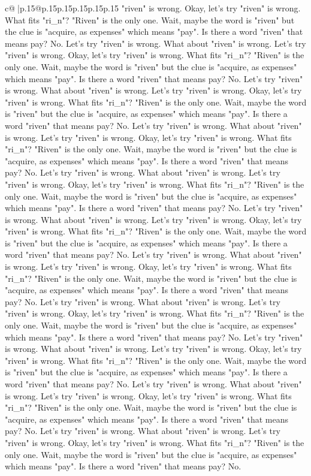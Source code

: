 \documentclass{article}
\begin{document}
{\begin{supertabular}{c@{$\;$}|p{.15\linewidth}@{}p{.15\linewidth}p{.15\linewidth}p{.15\linewidth}p{.15\linewidth}p{.15\linewidth}}
{{{"riven" is wrong. Okay, let's try "riven" is wrong. What fits "ri\_n"? "Riven" is the only one. Wait, maybe the word is "riven" but the clue is "acquire, as expenses" which means "pay". Is there a word "riven" that means pay? No. Let's try "riven" is wrong. What about "riven" is wrong. Let's try "riven" is wrong. Okay, let's try "riven" is wrong. What fits "ri\_n"? "Riven" is the only one. Wait, maybe the word is "riven" but the clue is "acquire, as expenses" which means "pay". Is there a word "riven" that means pay? No. Let's try "riven" is wrong. What about "riven" is wrong. Let's try "riven" is wrong. Okay, let's try "riven" is wrong. What fits "ri\_n"? "Riven" is the only one. Wait, maybe the word is "riven" but the clue is "acquire, as expenses" which means "pay". Is there a word "riven" that means pay? No. Let's try "riven" is wrong. What about "riven" is wrong. Let's try "riven" is wrong. Okay, let's try "riven" is wrong. What fits "ri\_n"? "Riven" is the only one. Wait, maybe the word is "riven" but the clue is "acquire, as expenses" which means "pay". Is there a word "riven" that means pay? No. Let's try "riven" is wrong. What about "riven" is wrong. Let's try "riven" is wrong. Okay, let's try "riven" is wrong. What fits "ri\_n"? "Riven" is the only one. Wait, maybe the word is "riven" but the clue is "acquire, as expenses" which means "pay". Is there a word "riven" that means pay? No. Let's try "riven" is wrong. What about "riven" is wrong. Let's try "riven" is wrong. Okay, let's try "riven" is wrong. What fits "ri\_n"? "Riven" is the only one. Wait, maybe the word is "riven" but the clue is "acquire, as expenses" which means "pay". Is there a word "riven" that means pay? No. Let's try "riven" is wrong. What about "riven" is wrong. Let's try "riven" is wrong. Okay, let's try "riven" is wrong. What fits "ri\_n"? "Riven" is the only one. Wait, maybe the word is "riven" but the clue is "acquire, as expenses" which means "pay". Is there a word "riven" that means pay? No. Let's try "riven" is wrong. What about "riven" is wrong. Let's try "riven" is wrong. Okay, let's try "riven" is wrong. What fits "ri\_n"? "Riven" is the only one. Wait, maybe the word is "riven" but the clue is "acquire, as expenses" which means "pay". Is there a word "riven" that means pay? No. Let's try "riven" is wrong. What about "riven" is wrong. Let's try "riven" is wrong. Okay, let's try "riven" is wrong. What fits "ri\_n"? "Riven" is the only one. Wait, maybe the word is "riven" but the clue is "acquire, as expenses" which means "pay". Is there a word "riven" that means pay? No. Let's try "riven" is wrong. What about "riven" is wrong. Let's try "riven" is wrong. Okay, let's try "riven" is wrong. What fits "ri\_n"? "Riven" is the only one. Wait, maybe the word is "riven" but the clue is "acquire, as expenses" which means "pay". Is there a word "riven" that means pay? No. Let's try "riven" is wrong. What about "riven" is wrong. Let's try "riven" is wrong. Okay, let's try "riven" is wrong. What fits "ri\_n"? "Riven" is the only one. Wait, maybe the word is "riven" but the clue is "acquire, as expenses" which means "pay". Is there a word "riven" that means pay? No. }}}
\end{supertabular}}
\end{document}
